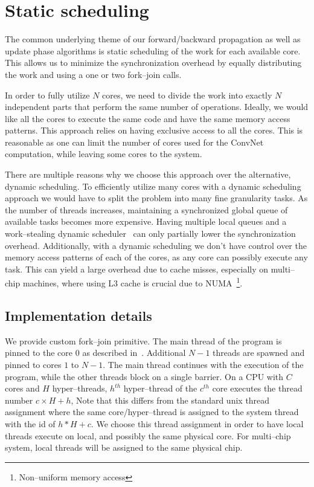 \section{Static scheduling}

  The common underlying theme of our forward/backward propagation as
  well as update phase algorithms is static scheduling of the work for
  each available core.  This allows us to minimize the synchronization
  overhead by equally distributing the work and using a one or two
  fork--join calls.

  In order to fully utilize $N$ cores, we need to divide the work into
  exactly $N$ independent parts that perform the same number of
  operations.  Ideally, we would like all the cores to execute the
  same code and have the same memory access patterns.  This approach
  relies on having exclusive access to all the cores.  This is
  reasonable as one can limit the number of cores used for the ConvNet
  computation, while leaving some cores to the system.

  There are multiple reasons why we choose this approach over the
  alternative, dynamic scheduling.  To efficiently utilize many cores
  with a dynamic scheduling approach we would have to split the
  problem into many fine granularity tasks.  As the number of threads
  increases, maintaining a synchronized global queue of available
  tasks becomes more expensive.  Having multiple local queues and a
  work--stealing dynamic
  scheduler~\cite{reinders2007intel,willhalm2008putting} can only
  partially lower the synchronization overhead.  Additionally, with a
  dynamic scheduling we don't have control over the memory access
  patterns of each of the cores, as any core can possibly execute any
  task.  This can yield a large overhead due to cache misses,
  especially on multi--chip machines, where using L3 cache is crucial
  due to NUMA~\footnote{Non--uniform memory access}.

  \subsection{Implementation details}

  We provide custom fork--join primitive.  The main thread of the
  program is pinned to the core $0$ as described
  in~\cite{jeffers2015high}. Additional $N-1$ threads are spawned and
  pinned to cores $1$ to $N-1$.  The main thread continues with the
  execution of the program, while the other threads block on a single
  barrier.  On a CPU with $C$ cores and $H$ hyper--threads, $h^{th}$
  hyper--thread of the $c^{th}$ core executes the thread number $c
  \times H + h$, Note that this differs from the standard unix thread
  assignment where the same core/hyper--thread is assigned to the
  system thread with the id of $h * H + c$.  We choose this thread
  assignment in order to have local threads execute on local, and
  possibly the same physical core.  For multi--chip system, local
  threads will be assigned to the same physical chip.

